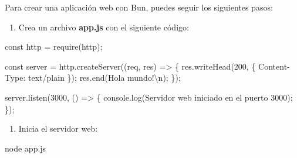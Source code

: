 \documentclass[
  a4paper,
  DIV=11,
  numbers=noendperiod,
  onepage,
  openany]{scrreprt}
\newenvironment{Shaded}{\begin{snugshade}}{\end{snugshade}}
\newcommand{\BuiltInTok}[1]{\textcolor[rgb]{0.00,0.23,0.31}{#1}}
\newcommand{\DecValTok}[1]{\textcolor[rgb]{0.68,0.00,0.00}{#1}}
\newcommand{\ExtensionTok}[1]{\textcolor[rgb]{0.00,0.23,0.31}{#1}}
\newcommand{\FunctionTok}[1]{\textcolor[rgb]{0.28,0.35,0.67}{#1}}
\newcommand{\KeywordTok}[1]{\textcolor[rgb]{0.00,0.23,0.31}{#1}}
\newcommand{\NormalTok}[1]{\textcolor[rgb]{0.00,0.23,0.31}{#1}}
\newcommand{\OperatorTok}[1]{\textcolor[rgb]{0.37,0.37,0.37}{#1}}
\newcommand{\PreprocessorTok}[1]{\textcolor[rgb]{0.68,0.00,0.00}{#1}}
\newcommand{\SpecialCharTok}[1]{\textcolor[rgb]{0.37,0.37,0.37}{#1}}
\newcommand{\StringTok}[1]{\textcolor[rgb]{0.13,0.47,0.30}{#1}}
\providecommand{\tightlist}{%
  \setlength{\itemsep}{0pt}\setlength{\parskip}{0pt}}\usepackage{longtable,booktabs,array}
\begin{document}
Para crear una aplicación web con Bun, puedes seguir los siguientes
pasos:

\begin{enumerate}
\def\labelenumi{\arabic{enumi}.}
\tightlist
\item
  Crea un archivo \textbf{app.js} con el siguiente código:
\end{enumerate}

\begin{Shaded}
\begin{Highlighting}[]
\KeywordTok{const}\NormalTok{ http }\OperatorTok{=} \PreprocessorTok{require}\NormalTok{(}\StringTok{\textquotesingle{}http\textquotesingle{}}\NormalTok{)}\OperatorTok{;}

\KeywordTok{const}\NormalTok{ server }\OperatorTok{=}\NormalTok{ http}\OperatorTok{.}\FunctionTok{createServer}\NormalTok{((req}\OperatorTok{,}\NormalTok{ res) }\KeywordTok{=\textgreater{}}\NormalTok{ \{}
\NormalTok{  res}\OperatorTok{.}\FunctionTok{writeHead}\NormalTok{(}\DecValTok{200}\OperatorTok{,}\NormalTok{ \{ }\StringTok{\textquotesingle{}Content{-}Type\textquotesingle{}}\OperatorTok{:} \StringTok{\textquotesingle{}text/plain\textquotesingle{}}\NormalTok{ \})}\OperatorTok{;}
\NormalTok{  res}\OperatorTok{.}\FunctionTok{end}\NormalTok{(}\StringTok{\textquotesingle{}Hola mundo!}\SpecialCharTok{\textbackslash{}n}\StringTok{\textquotesingle{}}\NormalTok{)}\OperatorTok{;}
\NormalTok{\})}\OperatorTok{;}

\NormalTok{server}\OperatorTok{.}\FunctionTok{listen}\NormalTok{(}\DecValTok{3000}\OperatorTok{,}\NormalTok{ () }\KeywordTok{=\textgreater{}}\NormalTok{ \{}
  \BuiltInTok{console}\OperatorTok{.}\FunctionTok{log}\NormalTok{(}\StringTok{\textquotesingle{}Servidor web iniciado en el puerto 3000\textquotesingle{}}\NormalTok{)}\OperatorTok{;}
\NormalTok{\})}\OperatorTok{;}
\end{Highlighting}
\end{Shaded}

\begin{enumerate}
\def\labelenumi{\arabic{enumi}.}
\setcounter{enumi}{1}
\tightlist
\item
  Inicia el servidor web:
\end{enumerate}

\begin{Shaded}
\begin{Highlighting}[]
\ExtensionTok{node}\NormalTok{ app.js}
\end{Highlighting}
\end{Shaded}
\end{document}
